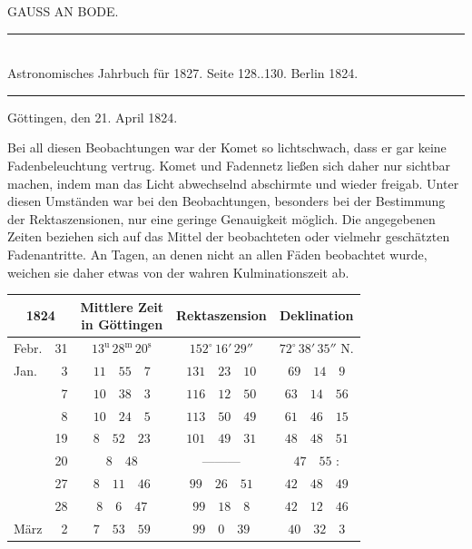\clearpage
{}

\begin{center}
{\large GAUSS AN BODE.}
\end{center}

\begin{center}
\rule{6cm}{0.4pt}\\
Astronomisches Jahrbuch für 1827. Seite 128..130. Berlin 1824.\\
\rule{6cm}{0.4pt}
\end{center}

\begin{flushright}
Göttingen, den 21. April 1824.
\end{flushright}

Bei all diesen Beobachtungen war der Komet so lichtschwach, dass er gar keine Fadenbeleuchtung vertrug. Komet und Fadennetz ließen sich daher nur sichtbar machen, indem man das Licht abwechselnd abschirmte und wieder freigab. Unter diesen Umständen war bei den Beobachtungen, besonders bei der Bestimmung der Rektaszensionen, nur eine geringe Genauigkeit möglich. Die angegebenen Zeiten beziehen sich auf das Mittel der beobachteten oder vielmehr geschätzten Fadenantritte. An Tagen, an denen nicht an allen Fäden beobachtet wurde, weichen sie daher etwas von der wahren Kulminationszeit ab.

\begin{center}
\begingroup\small\setlength{\tabcolsep}{4pt}
\begin{tabular}{lr|c|c|c}
\multicolumn{2}{c|}{1824} & \shortstack{Mittlere Zeit\\in Göttingen} & Rektaszension & Deklination \\
\hline
Febr. & 31 & $13^{\mathrm u}\,28^{\mathrm m}\,20^{\mathrm s}$ & $152^\circ\,16'\,29''$ & $72^\circ\,38'\,35''$ N. \\
Jan. & 3 & $11\quad55\quad7$ & $131\quad23\quad10$ & $69\quad14\quad9$ \\
 & 7 & $10\quad38\quad3$ & $116\quad12\quad50$ & $63\quad14\quad56$ \\
 & 8 & $10\quad24\quad5$ & $113\quad50\quad49$ & $61\quad46\quad15$ \\
 & 19 & $8\quad52\quad23$ & $101\quad49\quad31$ & $48\quad48\quad51$ \\
 & 20 & $8\quad48$ & ---\quad---\quad--- & $47\quad55$ \quad : \\
 & 27 & $8\quad11\quad46$ & $99\quad26\quad51$ & $42\quad48\quad49$ \\
 & 28 & $8\quad6\quad47$ & $99\quad18\quad8$ & $42\quad12\quad46$ \\
März & 2 & $7\quad53\quad59$ & $99\quad0\quad39$ & $40\quad32\quad3$ \\
\end{tabular}
\endgroup
\end{center}

